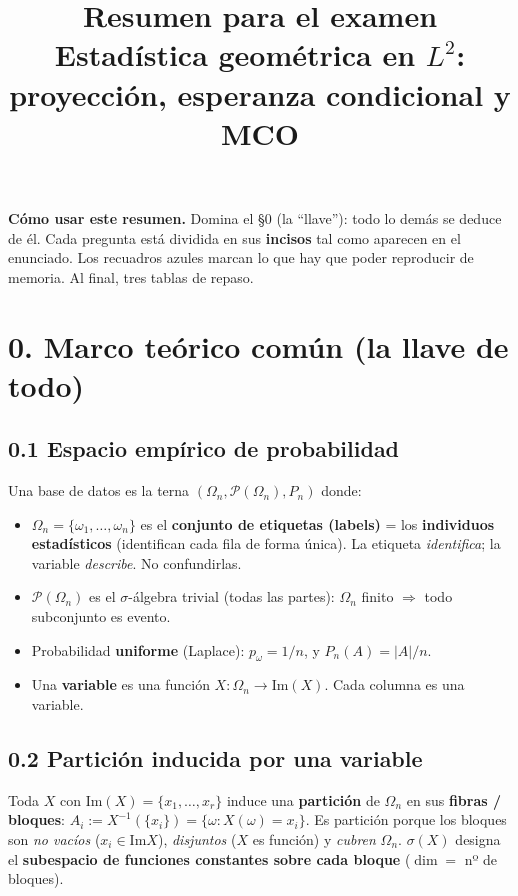 \documentclass[11pt]{article}
\title{\textbf{Resumen para el examen}\\[2pt]
\large Estadística geométrica en $L^2$: proyección, esperanza condicional y MCO}
\author{}
\date{}
\newcommand{\Om}{\Omega_n}
\newcommand{\sg}{\sigma}
\begin{document}
\maketitle
\vspace{-2.5em}

\begin{keybox}
\small\textbf{Cómo usar este resumen.} Domina el §0 (la ``llave''): todo lo demás se deduce de él.
Cada pregunta está dividida en sus \textbf{incisos} tal como aparecen en el enunciado. Los recuadros
azules marcan lo que hay que poder reproducir de memoria. Al final, tres tablas de repaso.
\end{keybox}

\section*{0. Marco teórico común (la llave de todo)}

\subsection*{0.1 Espacio empírico de probabilidad}
Una base de datos es la terna $(\Om,\mathcal P(\Om),P_n)$ donde:
\begin{itemize}[leftmargin=1.4em,itemsep=1pt]
\item $\Om=\{\omega_1,\dots,\omega_n\}$ es el \textbf{conjunto de etiquetas (labels)} = los
\textbf{individuos estadísticos} (identifican cada fila de forma única). La etiqueta \emph{identifica};
la variable \emph{describe}. No confundirlas.
\item $\mathcal P(\Om)$ es el $\sigma$-álgebra trivial (todas las partes): $\Om$ finito $\Rightarrow$ todo subconjunto es evento.
\item Probabilidad \textbf{uniforme} (Laplace): $p_\omega=1/n$, y $P_n(A)=|A|/n$.
\item Una \textbf{variable} es una función $X:\Om\to\mathrm{Im}(X)$. Cada columna es una variable.
\end{itemize}

\subsection*{0.2 Partición inducida por una variable}
Toda $X$ con $\mathrm{Im}(X)=\{x_1,\dots,x_r\}$ induce una \textbf{partición} de $\Om$ en sus
\textbf{fibras / bloques}: $A_i:=X^{-1}(\{x_i\})=\{\omega:X(\omega)=x_i\}$. Es partición porque los
bloques son \emph{no vacíos} ($x_i\in\mathrm{Im}X$), \emph{disjuntos} ($X$ es función) y \emph{cubren}
$\Om$. $\sg(X)$ designa el \textbf{subespacio de funciones constantes sobre cada bloque} ($\dim=$ nº de bloques).
\end{document}
